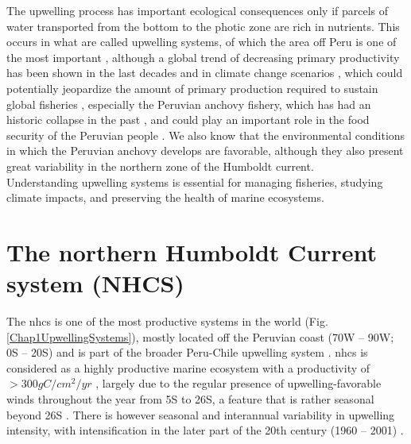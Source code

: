 The upwelling process has important ecological consequences only if parcels of water transported from the bottom to the photic zone are rich in nutrients. This occurs in what are called upwelling systems, of which the area off Peru is one of the most important \citep{ChavBert2008}, although  a global trend of decreasing primary productivity has been shown in the last decades \citep{Dema2009,Roxy2016} and in climate change scenarios \citep{Blanc2012,Kulk2020}, which could potentially jeopardize the amount of primary production required to sustain global fisheries \citep{PaulChri1995}, especially the Peruvian anchovy fishery, which has had an historic collapse in the past \citep{AriaNiqu2011,Aria2012}, and could play an important role in the food security of the Peruvian people \citep{MajlDela2017}. We also know that the environmental conditions in which the Peruvian anchovy develops are favorable, although they also present great variability in the northern zone of the Humboldt current.\\

Understanding upwelling systems is essential for managing fisheries, studying climate impacts, and preserving the health of marine ecosystems.\\

\clearpage

\section{The northern Humboldt Current system (NHCS)}\label{Chap1NHCS}

The \acrfull{nhcs} is one of the most productive systems in the world (Fig. \ref{Chap1UpwellingSystems}), mostly located off the Peruvian coast (70\textdegree W – 90\textdegree W; 0\textdegree S – 20\textdegree S) and is part of the broader Peru-Chile upwelling system \citep{GradChai2018}. \acrshort{nhcs} is considered as a highly productive marine ecosystem with a productivity of $>300 g C/cm^{2}/yr$ \citep{KampCap5}, largely due to the regular presence of upwelling-favorable winds throughout the year from 5\textdegree S to 26\textdegree S, a feature that is rather seasonal beyond 26\textdegree S \citep{Belm2014}. There is however seasonal and interannual variability in upwelling intensity, with intensification in the later part of the 20th century (1960 – 2001) \citep{Nara2010}.\\

